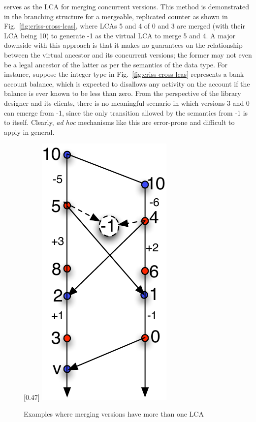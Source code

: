 serves as the LCA for merging concurrent versions. This method is
demonstrated in the branching structure for a mergeable, replicated
counter as shown in Fig.~\ref{fig:criss-cross-lcas}, where LCAs 5 and
4 of 0 and 3 are merged (with their LCA being 10) to generate -1 as
the virtual LCA to merge 5 and 4. A major downside with this approach
is that it makes no guarantees on the relationship between the virtual
ancestor and its concurrent versions; the former may not even be a
legal ancestor of the latter as per the semantics of the data type.
For instance, suppose the integer type in
Fig.~\ref{fig:criss-cross-lcas} represents a bank account balance,
which is expected to disallows any activity on the account if the
balance is ever known to be less than zero.  From the perspective of
the library designer and its clients, there is no meaningful scenario
in which versions 3 and 0 can emerge from -1, since the only
transition allowed by the semantics from -1 is to itself.  Clearly,
\emph{ad hoc} mechanisms like this are error-prone and difficult to
apply in general.

\begin{figure}[!t]
\centering
{} [0.47\columnwidth] {
  \includegraphics[scale=0.55]{Figures/2-LCAs}
}
\caption{Examples where merging versions have more than one LCA}
\label{fig:many-lcas}
\end{figure}

